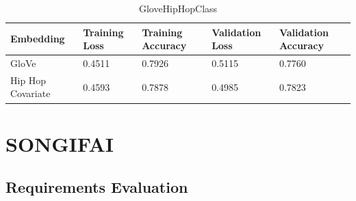 \begin{table}[ht]
	\centering
	\begin{tabular}{ | p{3cm} | p{2cm} | p{2cm} | p{2cm} | p{2cm} |}
		\hline
		\textbf{Embedding} & \textbf{Training Loss} & \textbf{Training Accuracy} & \textbf{Validation Loss} & \textbf{Validation Accuracy}\\ \hline
		GloVe & 0.4511 & 0.7926 & 0.5115 & 0.7760\\ \hline
		Hip Hop Covariate & 0.4593 & 0.7878 & 0.4985 & 0.7823\\ \hline
	\end{tabular}
	\label{Tab:GloveHipHopClass}
	\caption{GloveHipHopClass}
\end{table}
\section{SONGIFAI}
\subsection{Requirements Evaluation}

